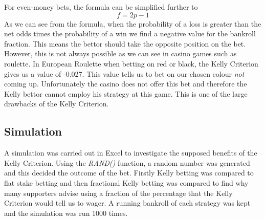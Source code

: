 \documentclass[12pt]{article}
\begin{document}
For even-money bets, the formula can be simplified further to
$$f=2p-1$$
As we can see from the formula, when the probability of a loss is greater than the net odds times the probability of a win we find a negative value for the bankroll fraction. This means the bettor should take the opposite position on the bet. However, this is not always possible as we can see in casino games such as roulette. In European Roulette when betting on red or black, the Kelly Criterion gives us a value of -0.027. This value tells us to bet on our chosen colour \emph{not} coming up. Unfortunately the casino does not offer this bet and therefore the Kelly bettor cannot employ his strategy at this game. This is one of the large drawbacks of the Kelly Criterion.

\subsection{Simulation}
A simulation was carried out in Excel to investigate the supposed benefits of the Kelly Criterion. Using the \emph{RAND()} function, a random number was generated and this decided the outcome of the bet. Firstly Kelly betting was compared to flat stake betting and then fractional Kelly betting was compared to find why many supporters advise using a fraction of the percentage that the Kelly Criterion would tell us to wager. A running bankroll of each strategy was kept and the simulation was run 1000 times.
\end{document}
